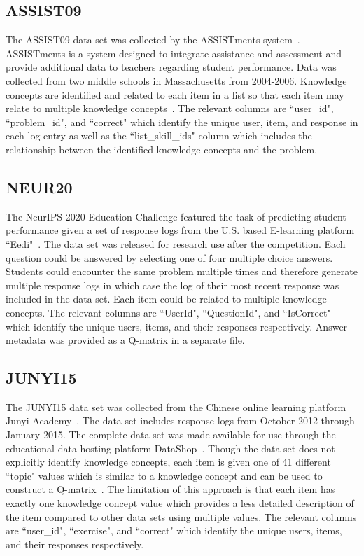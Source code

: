 \documentclass[letterpaper, 12pt, captions=tableabove]{scrreprt}
\begin{document}
		\subsection{ASSIST09}
		\label{sub:ASSIST09}
			The ASSIST09 data set was collected by the ASSISTments system~\cite{feng2009}. ASSISTments is a system designed to integrate assistance and assessment and provide additional data to teachers regarding student performance. Data was collected from two middle schools in Massachusetts from 2004-2006. Knowledge concepts are identified and related to each item in a list so that each item may relate to multiple knowledge concepts~\cite{assist09}.  The relevant columns are ``user\_id", ``problem\_id", and ``correct" which identify the unique user, item, and response in each log entry as well as the ``list\_skill\_ids" column which includes the relationship between the identified knowledge concepts and the problem.

		\subsection{NEUR20}
		\label{sub:NEUR20}
			The NeurIPS 2020 Education Challenge featured the task of predicting student performance given a set of response logs from the U.S. based E-learning platform ``Eedi"~\cite{wang2020b}. The data set was released for research use after the competition. Each question could be answered by selecting one of four multiple choice answers. Students could encounter the same problem multiple times and therefore generate multiple response logs in which case the log of their most recent response was included in the data set. Each item could be related to multiple knowledge concepts. The relevant columns are ``UserId", ``QuestionId", and ``IsCorrect" which identify the unique users, items, and their responses respectively. Answer metadata was provided as a Q-matrix in a separate file. 
	
		\subsection{JUNYI15}
		\label{sub:JUNYI15}
			The JUNYI15 data set was collected from the Chinese online learning platform Junyi Academy~\cite{chang2015}. The data set includes response logs from October 2012 through January 2015. The complete data set was made available for use through the educational data hosting platform DataShop~\cite{koedinger2010}. Though the data set does not explicitly identify knowledge concepts, each item is given one of 41 different  ``topic" values which is similar to a knowledge concept and can be used to construct a Q-matrix~\cite{wang2024}. The limitation of this approach is that each item has exactly one knowledge concept value which provides a less detailed description of the item compared to other data sets using multiple values.  The relevant columns are ``user\_id", ``exercise", and ``correct" which identify the unique users, items, and their responses respectively.
	
\end{document}
